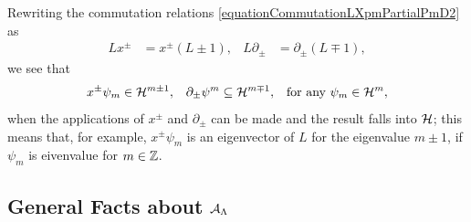 Rewriting the commutation relations \eqref{equationCommutationLXpmPartialPmD2} as
\begin{align}\label{equationCommutatorRewrittenXPMIncreasesDecreasesDegreesD2Hilbert}
L x^\pm &= x^\pm(L \pm 1), &  L \partial_\pm &= \partial_\pm (L \mp 1),
\end{align}
we see that
\begin{align}\label{equationX+XPlusIncreasesDecreasesDegreeEigenvalueL}
    x^\pm \psi_m &\in \mathcal H^{m \pm 1}, &
    \partial_\pm \psi^{m} &\subseteq \mathcal H^{m \mp 1}, 
    & \text{for any }\psi_m \in \mathcal H^m,
\end{align}
when the applications of $x^\pm$ and $\partial_\pm$ can be made and the result falls into $\mathcal H$; this means that, for example, $x^\pm \psi_m$ is an eigenvector of $L$ for the eigenvalue $m \pm 1$, if $\psi_m$ is eivenvalue for $m \in \mathbb{Z}$.



\subsection{General Facts about $\mathcal A_{\Lambda}$}

